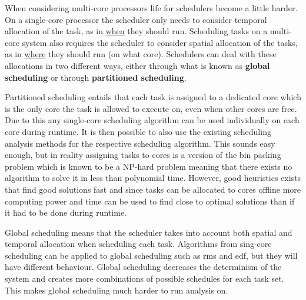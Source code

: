 \documentclass{kththesis}
\begin{document}
When considering multi-core processors life for schedulers become a little harder. On a single-core
processor the scheduler only needs to consider temporal allocation of the task, as in
\underline{when} they should run. Scheduling tasks on a multi-core system also requires the
scheduler to consider spatial allocation of the tasks, as in \underline{where} they should run
(on what core). Schedulers can deal with these allocations in two different ways, either through
what is known as \textbf{global scheduling} or through \textbf{partitioned scheduling}. 

Partitioned scheduling entails that each task is assigned to a dedicated core which is the only core
the task is allowed to execute on, even when other cores are free. Due to this any single-core
scheduling algorithm can be used individually on each core during runtime. It is then possible to
also use the existing scheduling analysis methods for the respective scheduling algorithm. This
sounds easy enough, but in reality assigning tasks to cores is a version of the bin packing problem
which is known to be a NP-hard problem meaning that there exists no algorithm to solve it in less
than polynomial time. However, good heuristics
\parencite{johnson_fast_1974}\parencite{coffman_application_1978} exists that find good solutions
fast and since tasks can be allocated to cores offline more computing power and time can be used to
find close to optimal solutions than if it had to be done during runtime.

Global scheduling means that the scheduler takes into account both spatial and temporal allocation
when scheduling each task. Algorithms from sing-core scheduling can be applied to global scheduling
such as \acrshort{rms} and \acrshort{edf}, but they will have different behaviour. Global scheduling
decreases the determinism of the system and creates more combinations of possible schedules for each
task set. This makes global scheduling much harder to run analysis on.
\end{document}
